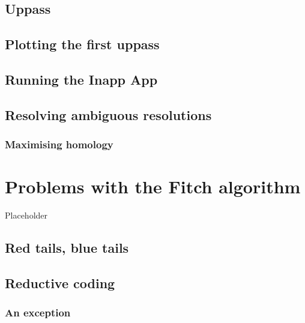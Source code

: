 \documentclass[]{book}
\theoremstyle{definition}
\theoremstyle{definition}
\theoremstyle{definition}
\theoremstyle{remark}
\begin{document}
\hypertarget{uppass}{%
\section{Uppass}\label{uppass}}

\hypertarget{plotting-the-first-uppass}{%
\section{Plotting the first uppass}\label{plotting-the-first-uppass}}

\hypertarget{running-the-inapp-app}{%
\section{Running the Inapp App}\label{running-the-inapp-app}}

\hypertarget{resolving-ambiguous-resolutions}{%
\section{Resolving ambiguous
resolutions}\label{resolving-ambiguous-resolutions}}

\hypertarget{maximising-homology}{%
\subsection{Maximising homology}\label{maximising-homology}}

\hypertarget{problems}{%
\chapter{Problems with the Fitch algorithm}\label{problems}}

Placeholder

\hypertarget{red-tails-blue-tails}{%
\section{Red tails, blue tails}\label{red-tails-blue-tails}}

\hypertarget{reductive-coding}{%
\section{Reductive coding}\label{reductive-coding}}

\hypertarget{an-exception}{%
\subsection{An exception}\label{an-exception}}
\end{document}
